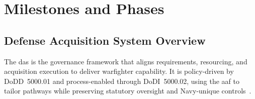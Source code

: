 \documentclass[../main.tex]{subfiles}
\begin{document}
\section{Milestones and Phases}

\subsection{Defense Acquisition System Overview}
The \ac{das} is the governance framework that aligns requirements, resourcing, and acquisition execution to deliver warfighter capability. It is policy-driven by DoDD~5000.01 and process-enabled through DoDI~5000.02, using the \ac{aaf} to tailor pathways while preserving statutory oversight and Navy-unique controls~\autocite{DoDD5000-01,DoDI5000-02}.
\end{document}
